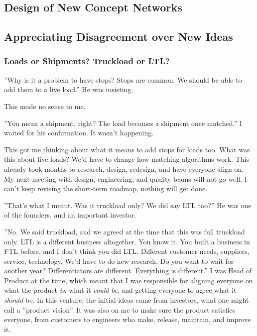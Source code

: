 \documentclass[graybox,envcountchap,sectrefs]{svmono}
\newcommand{\ncnf}{New Concept Network}
\begin{document}
\begin{partbacktext}
\part{Design of \ncnf s}
\label{pt-1}
\end{partbacktext}

\chapter{Appreciating Disagreement over New Ideas}
\label{c:introduction}


\section{Loads or Shipments? Truckload or LTL?}
''Why is it a problem to have stops? Stops are common. We should be able to add them to a live load.'' He was insisting.
 
This made no sense to me.
 
''You mean a shipment, right? The load becomes a shipment once matched.'' I waited for his confirmation. It wasn't happening.

This got me thinking about what it means to add stops for loads too. What was this about live loads? We'd have to change how matching algorithms work. This already took months to research, design, redesign, and have everyone align on. My next meeting with design, engineering, and quality teams will not go well. I can't keep revising the short-term roadmap, nothing will get done.
 
''That's what I meant. Was it truckload only? We did say LTL too?'' He was one of the founders, and an important investor.

''No. We said truckload, and we agreed at the time that this was full truckload only. LTL is a different business altogether. You know it. You built a business in FTL before, and I don't think you did LTL. Different customer needs, suppliers, service, technology. We'd have to do new research. Do you want to wait for another year? Differentiators are different. Everything is different.'' I was Head of Product at the time, which meant that I was responsible for aligning everyone on what the product \textit{is}, what it \textit{could be}, and getting everyone to agree what it \textit{should} be. In this venture, the initial ideas came from investors, what one might call a ''product vision''. It was also on me to make sure the product satisfies everyone, from customers to engineers who make, release, maintain, and improve it. 
\end{document}

